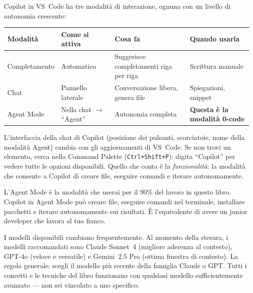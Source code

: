 Copilot in VS~Code ha tre modalità di interazione, ognuna con un livello di autonomia crescente:

\begin{center}
\begin{tabularx}{\textwidth}{l l X X}
\toprule
\textbf{Modalità} & \textbf{Come si attiva} & \textbf{Cosa fa} & \textbf{Quando usarla} \\
\midrule
Completamento & Automatico & Suggerisce completamenti riga per riga & Scrittura manuale \\
Chat & Pannello laterale & Conversazione libera, genera file & Spiegazioni, snippet \\
Agent Mode & Nella chat $\rightarrow$ ``Agent'' & Autonomia completa & \textbf{Questa è la modalità 0-code} \\
\bottomrule
\end{tabularx}
\end{center}

\begin{versionbox}
L'interfaccia della chat di Copilot (posizione dei pulsanti, scorciatoie, nome della modalità Agent) cambia con gli aggiornamenti di VS~Code. Se non trovi un elemento, cerca nella Command Palette (\texttt{Ctrl+Shift+P}): digita ``Copilot'' per vedere tutte le opzioni disponibili. Quello che conta è la \textit{funzionalità}: la modalità che consente a Copilot di creare file, eseguire comandi e iterare autonomamente.
\end{versionbox}

\begin{warnbox}
L'Agent Mode è la modalità che userai per il 90\% del lavoro in questo libro. Copilot in Agent Mode può creare file, eseguire comandi nel terminale, installare pacchetti e iterare autonomamente sui risultati. È l'equivalente di avere un junior developer che lavora al tuo fianco.
\end{warnbox}

\begin{versionbox}
I modelli disponibili cambiano frequentemente. Al momento della stesura, i modelli raccomandati sono Claude Sonnet~4 (migliore aderenza al contesto), GPT-4o (veloce e versatile) e Gemini~2.5 Pro (ottima finestra di contesto). La regola generale: scegli il modello più recente della famiglia Claude o GPT. Tutti i concetti e le tecniche del libro funzionano con qualsiasi modello sufficientemente avanzato --- non sei vincolato a uno specifico.
\end{versionbox}


